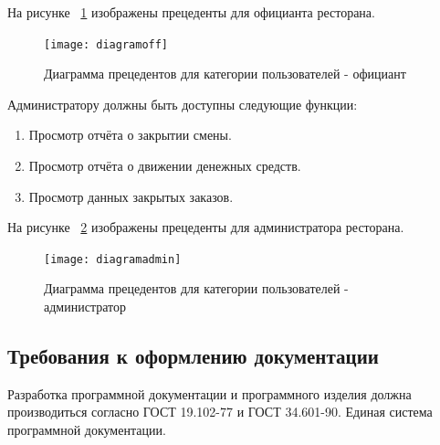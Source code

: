 На рисунке ~\ref{diagramoff:image} изображены прецеденты для официанта ресторана.
\begin{figure}[ht]
	\centering
	\texttt{[image: diagramoff]}
	\caption{Диаграмма прецедентов для категории пользователей - официант}
	\label{diagramoff:image}
\end{figure}
\newpage
Администратору должны быть доступны следующие функции:
\begin{enumerate}
	\item Просмотр отчёта о закрытии смены.
	\item Просмотр отчёта о движении денежных средств.
	\item Просмотр данных закрытых заказов.
\end{enumerate}
На рисунке ~\ref{diagramadmin:image} изображены прецеденты для администратора ресторана.
\begin{figure}[ht]
	\centering
	\texttt{[image: diagramadmin]}
	\caption{Диаграмма прецедентов для категории пользователей - администратор}
	\label{diagramadmin:image}
\end{figure}


\newpage
\subsection{Требования к оформлению документации}

Разработка программной документации и программного изделия должна производиться согласно ГОСТ 19.102-77 и ГОСТ 34.601-90. Единая система программной документации.
